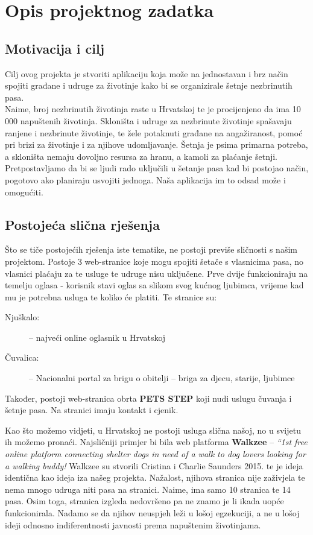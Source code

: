 \chapter{Opis projektnog zadatka}
		
		\section{Motivacija i cilj}
		Cilj ovog projekta je stvoriti aplikaciju koja može na jednostavan i brz način spojiti građane i udruge za životinje kako bi se organizirale šetnje nezbrinutih pasa.\\
		Naime, broj nezbrinutih životinja raste u Hrvatskoj te je procijenjeno da ima 10 000 napuštenih životinja. Skloništa i udruge za nezbrinute životinje spašavaju ranjene i
		nezbrinute životinje, te žele potaknuti građane na angažiranost, pomoć pri brizi za
		životinje i za njihove udomljavanje. Šetnja je psima primarna potreba, a skloništa nemaju dovoljno resursa za hranu, a kamoli za plaćanje šetnji. Pretpostavljamo da bi se ljudi rado uključili u šetanje pasa kad bi postojao način, pogotovo ako planiraju usvojiti jednoga. Naša aplikacija im to odsad može i omogućiti.\\
		
		\section{Postojeća slična rješenja}
		Što se tiče postojećih rješenja iste tematike, ne postoji previše sličnosti s našim projektom. Postoje 3 web-stranice koje mogu spojiti šetače s vlasnicima pasa, no vlasnici plaćaju za te usluge te udruge nisu uključene. Prve dvije funkcioniraju na temelju oglasa - korisnik stavi oglas sa slikom svog kućnog ljubimca, vrijeme kad mu je potrebna usluga te koliko će platiti. Te stranice su:
		\begin{description}
		\item [Njuškalo:] -- najveći online oglasnik u Hrvatskoj  
		\item [Čuvalica:] -- Nacionalni portal za brigu o obitelji -- briga za djecu, starije, ljubimce 
		\end{description}
		
		Također, postoji web-stranica obrta \textbf{PETS STEP} koji nudi uslugu čuvanja i šetnje pasa. Na stranici imaju kontakt i cjenik.\par
		Kao što možemo vidjeti, u Hrvatskoj ne postoji usluga slična našoj, no u svijetu ih možemo pronaći. Najsličniji primjer bi bila web platforma \textbf{Walkzee} -- \textit{``1st free online platform connecting shelter dogs in need of a walk to dog lovers looking for a walking buddy!} Walkzee su stvorili Cristina i Charlie Saunders 2015. te je ideja identična kao ideja iza našeg projekta. Nažalost, njihova stranica nije zaživjela te nema mnogo udruga niti pasa na stranici. Naime, ima samo 10 stranica te 14 pasa. Osim toga, stranica izgleda nedovršeno pa ne znamo je li ikada uopće funkcionirala. Nadamo se da njihov neuspjeh leži u lošoj egzekuciji, a ne u lošoj ideji odnosno indiferentnosti javnosti prema napuštenim životinjama. 
		
